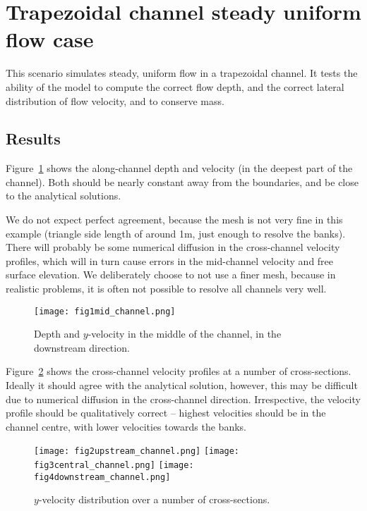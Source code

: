 \section{Trapezoidal channel steady uniform flow case}
This scenario simulates steady, uniform flow in a trapezoidal channel. It tests the ability of the model to compute the correct flow depth, and the correct lateral distribution of flow velocity, and to conserve mass.

\subsection{Results}
Figure~\ref{fig:fig1mid_channel} shows the along-channel depth and velocity (in the deepest part of the channel). Both should be nearly constant away from the boundaries, and be close to the analytical solutions. 

We do not expect perfect agreement, because the mesh is not very fine in this example (triangle side length of around 1m, just enough to resolve the banks). There will probably be some numerical diffusion in the cross-channel velocity profiles, which will in turn cause errors in the mid-channel velocity and free surface elevation. We deliberately choose to not use a finer mesh, because in realistic problems, it is often not possible to resolve all channels very well.

\begin{figure}
\begin{center}
\texttt{[image: fig1mid\_channel.png]}
\caption{Depth and $y$-velocity in the middle of the channel, in the downstream direction.}
\label{fig:fig1mid_channel}
\end{center}
\end{figure}

Figure~\ref{fig:xsect_vels} shows the cross-channel velocity profiles at a number of cross-sections. Ideally it should agree with the analytical solution, however, this may be difficult due to numerical diffusion in the cross-channel direction. Irrespective, the velocity profile should be qualitatively correct -- highest velocities should be in the channel centre, with lower velocities towards the banks.

\begin{figure}
\begin{center}
\texttt{[image: fig2upstream\_channel.png]}
\texttt{[image: fig3central\_channel.png]}
\texttt{[image: fig4downstream\_channel.png]}
\caption{$y$-velocity distribution over a number of cross-sections.}
\label{fig:xsect_vels}
\end{center}
\end{figure}

